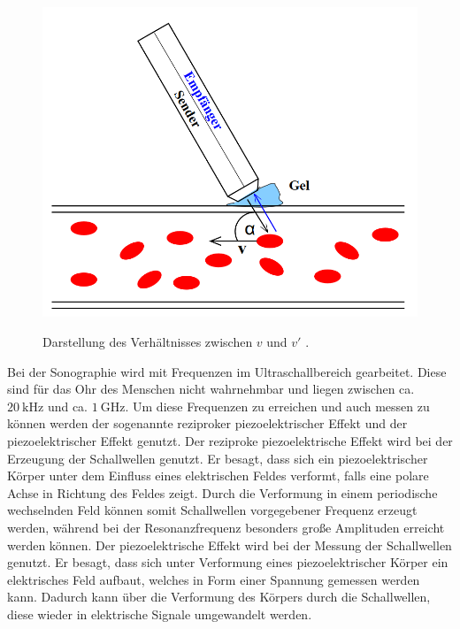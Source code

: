 \begin{figure}
	\centering
	\caption{Darstellung des Verhältnisses zwischen $v$ und $v'$ \cite{US3}.}
	\includegraphics[width=\linewidth-70pt,height=0.3\textheight,keepaspectratio]{content/images/GesSkizze.png}
	\label{fig:GesSkizze}
\end{figure}

Bei der Sonographie wird mit Frequenzen im Ultraschallbereich gearbeitet. Diese sind für das Ohr des Menschen nicht wahrnehmbar und liegen zwischen ca. $\SI{20}{\kilo\hertz}$ und ca. $\SI{1}{\giga\hertz}$. Um diese Frequenzen zu erreichen und auch messen zu können werden der sogenannte reziproker piezoelektrischer Effekt und der piezoelektrischer Effekt genutzt.
Der reziproke piezoelektrische Effekt wird bei der Erzeugung der Schallwellen genutzt. Er besagt, dass sich ein piezoelektrischer Körper unter dem Einfluss eines elektrischen Feldes verformt, falls eine polare Achse in Richtung des Feldes zeigt. Durch die Verformung in einem periodische wechselnden Feld können somit Schallwellen vorgegebener Frequenz erzeugt werden, während bei der Resonanzfrequenz besonders große Amplituden erreicht werden können. Der piezoelektrische Effekt wird bei der Messung der Schallwellen genutzt. Er besagt, dass sich unter Verformung eines piezoelektrischer Körper ein elektrisches Feld aufbaut, welches in Form einer Spannung gemessen werden kann. Dadurch kann über die Verformung des Körpers durch die Schallwellen, diese wieder in elektrische Signale umgewandelt werden.